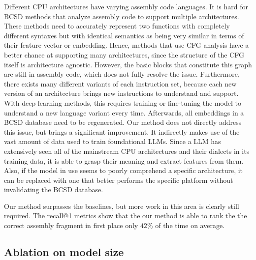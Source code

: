 Different CPU architectures have varying assembly code languages. It is hard for BCSD methods that analyze assembly code to support
multiple architectures. These methods need to accurately represent two functions with completely different syntaxes but with identical
semantics as being very similar in terms of their feature vector or embedding. Hence, methods that use CFG analysis have a better chance
at supporting many architectures, since the structure of the CFG itself is architecture agnostic. However, the basic blocks that constitute
this graph are still in assembly code, which does not fully resolve the issue. Furthermore, there exists many different variants of each
instruction set, because each new version of an architecture brings new instructions to understand and support. With deep learning methods,
this requires training or fine-tuning the model to understand a new language variant every time. Afterwards, all embeddings in a BCSD database need to
be regenerated. Our method does not directly address this issue, but brings a significant improvement. It indirectly makes use of the vast
amount of data used to train foundational LLMs. Since a LLM has extensively seen all of the mainstream CPU architectures and their dialects
in its training data, it is able to grasp their meaning and extract features from them. Also, if the model in use seems to poorly comprehend a
specific architecture, it can be replaced with one that better performs the specific platform without invalidating the BCSD database.

Our method surpasses the baselines, but more work in this area is clearly still required. The recall@1 metrics show that the our method
is able to rank the the correct assembly fragment in first place only \(42\%\) of the time on average.

\subsection{Ablation on model size}

